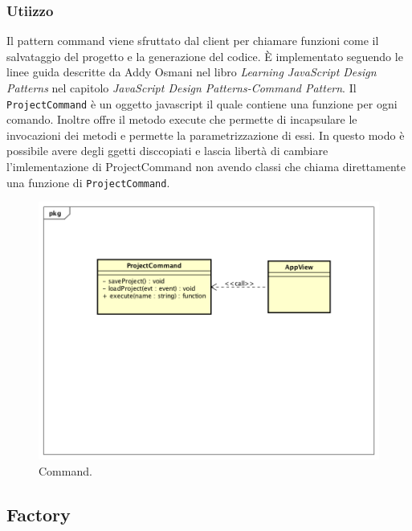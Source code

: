 \subsubsection{Utiizzo}
Il pattern command viene sfruttato dal client per chiamare funzioni come il salvataggio del progetto e la generazione del codice. È implementato seguendo le linee guida descritte da Addy Osmani nel libro \emph{Learning JavaScript Design Patterns} nel capitolo \emph{JavaScript Design Patterns-Command Pattern}. Il \texttt{ProjectCommand} è un oggetto javascript il quale contiene una funzione per ogni comando. Inoltre offre il metodo execute che permette di incapsulare le invocazioni dei metodi e permette la parametrizzazione di essi. In questo modo è possibile avere degli ggetti disccopiati e lascia libertà di cambiare l'imlementazione di ProjectCommand non avendo classi che chiama direttamente una funzione di \texttt{ProjectCommand}.
\begin{figure}[H] \label{fig:command}
	\includegraphics[scale=0.6]{img/commandExample.png}
	\caption{Command.}
\end{figure}

\subsection{Factory}

